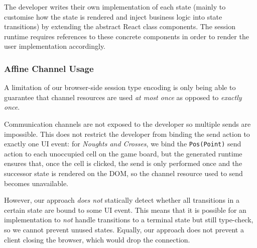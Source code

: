 The developer writes their own implementation of each state (mainly to
customise how the state is rendered and inject business logic into state
transitions) by extending the abstract React class components.
The session runtime requires references to these concrete components in order to
render the user implementation accordingly.

\subsubsection{Affine Channel Usage}
A limitation of our browser-side session type encoding is only being able to
guarantee that channel resources are used \textit{at most once} as opposed to
\textit{exactly once}.

Communication channels are not exposed to the developer so multiple sends are
impossible.
This does not restrict the developer from binding the send action to exactly
one UI event: for \textit{Noughts and Crosses}, we bind the \texttt{Pos(Point)}
send action to each unoccupied cell on the game board, but the generated
runtime ensures that, once the cell is clicked, the send is only performed once
and the successor state is rendered on the DOM, so the channel resource used to
send becomes unavailable.

However, our approach \textit{does not} statically detect whether all
transitions in a certain state are bound to some UI event.
This means that it is possible for an implementation to \textit{not} handle
transitions to a terminal state but still type-check, so we cannot prevent
unused states. Equally, our approach does not prevent a client closing the browser, which would drop the connection.
